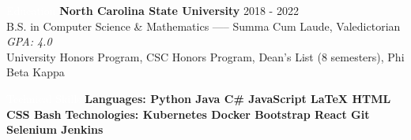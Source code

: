 \documentclass{resume}
\begin{document}
\setlength\fboxsep{0.33em}

\begin{rSection}{\colorbox{NCSURED}{\textcolor{WHITE}{Education}}}
{\bf North Carolina State University} \hfill {2018 - 2022} \\ 
B.S. in Computer Science \& Mathematics ----- Summa Cum Laude, Valedictorian \hfill {\em GPA: 4.0}\\
University Honors Program, CSC Honors Program, Dean's List (8 semesters), Phi Beta Kappa

\end{rSection}

\begin{rSection}{\colorbox{NCSURED}{\textcolor{WHITE}{Technical Skills}}}
	\textbf{Languages:
		\hspace*{0.275cm}
		{Python} \textbar
		{ Java} \textbar
		{ C\#} \textbar
		{ JavaScript} \textbar
		{ \LaTeX} \textbar
		{ HTML} \textbar
		{ CSS} \textbar
		{ Bash}
	} \newline
	\textbf{Technologies:
		{Kubernetes} \textbar
		{ Docker} \textbar
		{ Bootstrap} \textbar
		{ React} \textbar
		{ Git} \textbar
		{ Selenium} \textbar
		{ Jenkins}
	}	
\end{rSection}
\end{document}
